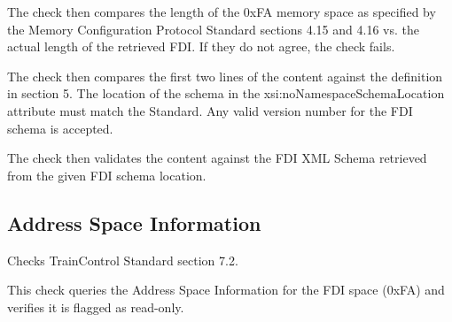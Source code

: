 The check then compares the length of the 0xFA memory space 
as specified by the Memory Configuration Protocol Standard sections 4.15 and 4.16
vs. the actual length of the retrieved FDI.
If they do not agree, the check fails.

The check then compares the first two lines of the content against the 
definition in section 5. 
The location of the schema in the xsi:noNamespaceSchemaLocation attribute 
must match the Standard.
Any valid version number for the FDI schema is accepted.

The check then validates the content against the FDI XML Schema
retrieved from the given FDI schema location.

\subsection{Address Space Information}

Checks TrainControl Standard section 7.2.

This check queries the Address Space Information for the FDI space (0xFA) and verifies
it is flagged as read-only.


  
